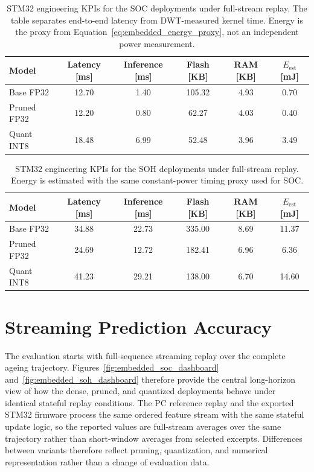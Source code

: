 \documentclass[
    a4paper,
    12pt,
    titlepage,
    bibliography=totoc,
    twoside=on,
    parskip=false,
    numbers=noenddot,
    cleardoublepage=empty,
    DIV=12,
    BCOR=12.0mm,
    headheight=36pt,
    headings=openright
]{scrreprt}
\begin{document}
\begin{table}[H]
    \centering
    \caption[STM32 KPIs for SOC deployments.]{STM32 engineering KPIs for the SOC deployments under full-stream replay. The table separates end-to-end latency from DWT-measured kernel time. Energy is the proxy from Equation~\ref{eq:embedded_energy_proxy}, not an independent power measurement.}
    \label{tab:embedded_soc_kpi}
    \begin{tabular}{@{}lccccc@{}}
        \toprule
        Model & Latency [ms] & Inference [ms] & Flash [KB] & RAM [KB] & $E_{\mathrm{est}}$ [mJ] \\
        \midrule
        Base FP32 & 12.70 & 1.40 & 105.32 & 4.93 & 0.70 \\
        Pruned FP32 & 12.20 & 0.80 & 62.27 & 4.03 & 0.40 \\
        Quant INT8 & 18.48 & 6.99 & 52.48 & 3.96 & 3.49 \\
        \bottomrule
    \end{tabular}
\end{table}

\begin{table}[H]
    \centering
    \caption[STM32 KPIs for SOH deployments.]{STM32 engineering KPIs for the SOH deployments under full-stream replay. Energy is estimated with the same constant-power timing proxy used for SOC.}
    \label{tab:embedded_soh_kpi}
    \begin{tabular}{@{}lccccc@{}}
        \toprule
        Model & Latency [ms] & Inference [ms] & Flash [KB] & RAM [KB] & $E_{\mathrm{est}}$ [mJ] \\
        \midrule
        Base FP32 & 34.88 & 22.73 & 335.00 & 8.69 & 11.37 \\
        Pruned FP32 & 24.69 & 12.72 & 182.41 & 6.96 & 6.36 \\
        Quant INT8 & 41.23 & 29.21 & 138.00 & 6.70 & 14.60 \\
        \bottomrule
    \end{tabular}
\end{table}

\section{Streaming Prediction Accuracy}
The evaluation starts with full-sequence streaming replay over the complete ageing trajectory. Figures~\ref{fig:embedded_soc_dashboard} and~\ref{fig:embedded_soh_dashboard} therefore provide the central long-horizon view of how the dense, pruned, and quantized deployments behave under identical stateful replay conditions. The PC reference replay and the exported STM32 firmware process the same ordered feature stream with the same stateful update logic, so the reported values are full-stream averages over the same trajectory rather than short-window averages from selected excerpts. Differences between variants therefore reflect pruning, quantization, and numerical representation rather than a change of evaluation data.
\end{document}
